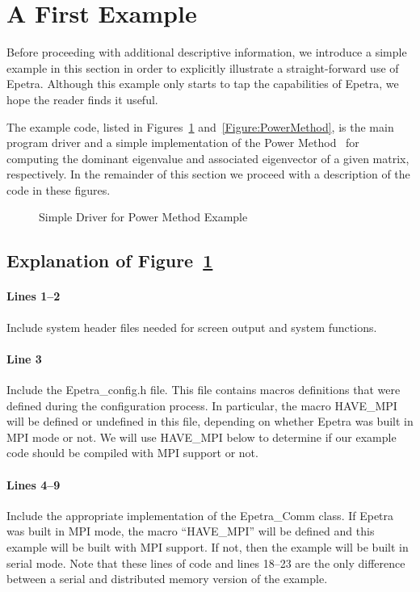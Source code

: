 \documentclass[12pt,relax]{EpetraUserGuide}
\newcommand{\comm}{Epetra\_Comm}
\begin{document}
\section{A First Example}
\label{Section:FirstExample}
Before proceeding with additional descriptive information, we
introduce a simple example in this section in order to explicitly
illustrate a straight-forward use of Epetra.  Although this example only
starts to tap the capabilities of Epetra, we hope the reader finds it
useful.

The example code, listed in Figures~\ref{Figure:FirstExample}
and~\ref{Figure:PowerMethod}, is the main program driver and
a simple implementation of the Power Method~\cite{GoluVanL96} for computing the dominant
eigenvalue and associated eigenvector of a given matrix,
respectively.  In the remainder of this section we proceed with a
description of the code in these figures.
\begin{figure}
\begin{center}

\end{center}
\caption{\label{Figure:FirstExample} Simple Driver for Power Method Example}
\end{figure}

\subsection{Explanation of Figure~\ref{Figure:FirstExample}}

\paragraph{Lines 1--2}
Include system header files needed for screen output and system
functions.
\paragraph{Line 3}
Include the Epetra\_config.h file.  This file contains macros
definitions that were defined during the configuration process.  In
particular, the macro HAVE\_MPI will be defined or undefined in this
file, depending on whether Epetra was built in MPI mode or not.  We
will use HAVE\_MPI below to determine if our example code should be
compiled with MPI support or not.
\paragraph{Lines 4--9}
Include the appropriate implementation of the \comm{} class.  If
Epetra was built in MPI mode, the macro ``HAVE\_MPI'' will be defined
and this example will be built with MPI support.  If not, then the
example will be built in serial mode.  Note that these lines of code
 and lines 18--23 are the only difference between a serial and distributed memory
version of the example.
\end{document}
